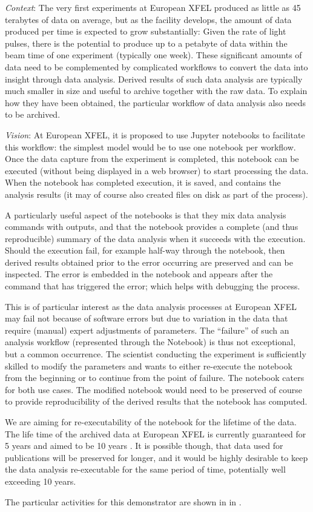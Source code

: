   \emph{Context}: The very first experiments at European XFEL
  produced as little as 45 terabytes of data on average, but as the
  facility develops, the amount of data produced per time is expected
  to grow substantially: Given the rate of light pulses, there is the
  potential to produce up to a petabyte of data within the beam time
  of one experiment (typically one week). These significant amounts of
  data need to be complemented by complicated workflows to convert the
  data into insight through data analysis. Derived results of such
  data analysis are typically much smaller in size and useful to
  archive together with the raw data. To explain how they have been
  obtained, the particular workflow of data analysis also needs to be
  archived.

  \medskip
  \emph{Vision}:
  At European XFEL, it is proposed to use Jupyter notebooks to facilitate
  this workflow: the simplest model would be to use one notebook per
  workflow. Once the data capture from the experiment is completed,
  this notebook can be executed (without being displayed in a web
  browser) to start processing the data. When the notebook has
  completed execution, it is saved, and contains the analysis results
  (it may of course also created files on disk as part of the
  process).

  A particularly useful aspect of the notebooks is that they mix data
  analysis commands with outputs, and that the notebook provides a
  complete (and thus reproducible) summary of the data analysis when
  it succeeds with the execution. Should the execution fail, for
  example half-way through the notebook, then derived results obtained
  prior to the error occurring are preserved and can be inspected. The
  error is embedded in the notebook and appears after the command that
  has triggered the error; which helps with debugging the process.

  This is of particular interest as the data analysis processes at
  European XFEL may fail not because of software errors but due to
  variation in the data that require (manual) expert adjustments of
  parameters. The ``failure'' of such an analysis workflow
  (represented through the Notebook) is thus not exceptional, but a
  common occurrence. The scientist conducting the experiment is
  sufficiently skilled to modify the parameters and wants to either
  re-execute the notebook from the beginning or to continue from the
  point of failure. The notebook caters for both use cases. The
  modified notebook would need to be preserved of course to provide
  reproducibility of the derived results that the notebook has
  computed.

  We are aiming for re-executability of the notebook for the lifetime
  of the data. The life time of the archived data at European XFEL is
  currently guaranteed for 5 years and aimed to be 10 years
  \cite{EuXFEL-datapolicy-2017}. It is possible though, that data used
  for publications will be preserved for longer, and it would be
  highly desirable to keep the data analysis re-executable for the
  same period of time, potentially well exceeding 10 years.

  The particular activities for this demonstrator are shown in
   in .
